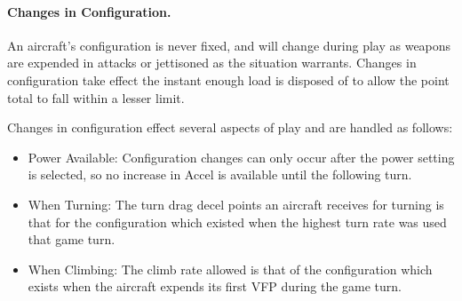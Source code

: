 \paragraph{Changes in Configuration.} An aircraft's configuration is never fixed, and will change during play as weapons are expended in attacks or jettisoned as the situation warrants. Changes in configuration take effect the instant enough load is disposed of to allow the point total to fall within a lesser limit.

Changes in configuration effect several aspects of play and are handled as follows:

\begin{itemize}

    \item Power Available: Configuration changes can only occur after the power setting is selected, so no increase in Accel is available until the following turn.

    \item When Turning: The turn drag decel points an aircraft receives for turning is that for the configuration which existed when the highest turn rate was used that game turn.

    \item When Climbing: The climb rate allowed is that of the configuration which exists when the aircraft expends its first VFP during the game turn.

\end{itemize}



